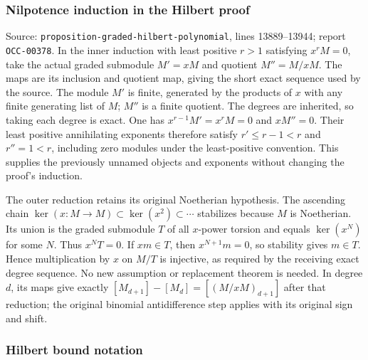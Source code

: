 \subsubsection{Nilpotence induction in the Hilbert proof}\label{algebra-proof-002-nilpotence-induction-in-the-hilbert-proof}

Source: \texttt{proposition-\AlgebraIdentifierBreak{}graded-\AlgebraIdentifierBreak{}hilbert-\AlgebraIdentifierBreak{}polynomial}, lines 13889--13944; report \texttt{OCC-00378}. In the inner induction with least positive \(r>1\) satisfying \(x^rM=0\), take the actual graded submodule \(M'=xM\) and quotient \(M''=M/xM\). The maps are its inclusion and quotient map, giving the short exact sequence used by the source. The module \(M'\) is finite, generated by the products of \(x\) with any finite generating list of \(M\); \(M''\) is a finite quotient. The degrees are inherited, so taking each degree is exact. One has \(x^{r-1}M'=x^rM=0\) and \(xM''=0\). Their least positive annihilating exponents therefore satisfy \(r'\leq r-1<r\) and \(r''=1<r\), including zero modules under the least-positive convention. This supplies the previously unnamed objects and exponents without changing the proof's induction.

The outer reduction retains its original Noetherian hypothesis. The ascending chain \(\ker(x:M\to M)\subset\ker(x^2)\subset\cdots\) stabilizes because \(M\) is Noetherian. Its union is the graded submodule \(T\) of all \(x\)-power torsion and equals \(\ker(x^N)\) for some \(N\). Thus \(x^NT=0\). If \(xm\in T\), then \(x^{N+1}m=0\), so stability gives \(m\in T\). Hence multiplication by \(x\) on \(M/T\) is injective, as required by the receiving exact degree sequence. No new assumption or replacement theorem is needed. In degree \(d\), its maps give exactly \([M_{d+1}]-[M_d]=[(M/xM)_{d+1}]\) after that reduction; the original binomial antidifference step applies with its original sign and shift.

\subsubsection{Hilbert bound notation}\label{algebra-proof-002-hilbert-bound-notation}

